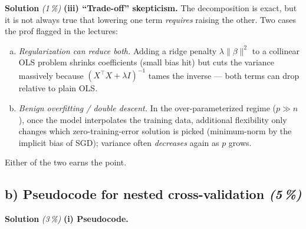 \documentclass[11pt,a4paper]{article}
\newcommand{\subpoints}[1]{\textit{(#1\,\%)}}
\newcommand{\sol}{\noindent\textbf{Solution}}
\begin{document}
\medskip
\sol{} \subpoints{1} \textbf{(iii) ``Trade-off'' skepticism.} The decomposition is exact, but it
is not always true that lowering one term \emph{requires} raising the other. Two cases the prof
flagged in the lectures:
\begin{enumerate}[(a)]
  \item \emph{Regularization can reduce both.} Adding a ridge penalty $\lambda\|\beta\|^2$ to a
        collinear OLS problem shrinks coefficients (small bias hit) but cuts the variance massively
        because $(X^\top X+\lambda I)^{-1}$ tames the inverse --- both terms can drop relative to
        plain OLS.
  \item \emph{Benign overfitting / double descent.} In the over-parameterized regime ($p\gg n$),
        once the model interpolates the training data, additional flexibility only changes which
        zero-training-error solution is picked (minimum-norm by the implicit bias of SGD);
        variance often \emph{decreases} again as $p$ grows.
\end{enumerate}
Either of the two earns the point.

\subsection*{b) Pseudocode for nested cross-validation \subpoints{5}}

\sol{} \subpoints{3} \textbf{(i) Pseudocode.}
\end{document}
